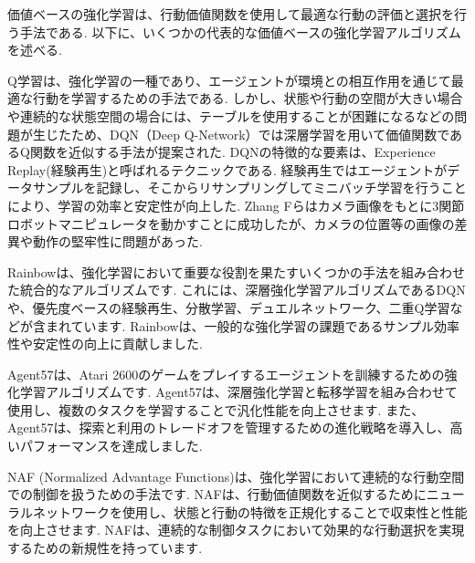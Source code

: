 \documentclass[a4j, twocolumn, 10pt,pdflatex,ja=standard]{bxjsarticle}
\renewcommand{\tablename}{表}
\def \tabref  #1{\tablename\ref{#1}}
\begin{document}

価値ベースの強化学習は、行動価値関数を使用して最適な行動の評価と選択を行う手法である. 以下に、いくつかの代表的な価値ベースの強化学習アルゴリズムを述べる. 

Q学習は、強化学習の一種であり、エージェントが環境との相互作用を通じて最適な行動を学習するための手法である. しかし、状態や行動の空間が大きい場合や連続的な状態空間の場合には、テーブルを使用することが困難になるなどの問題が生じたため、DQN（Deep Q-Network）\cite{dqn}では深層学習を用いて価値関数であるQ関数を近似する手法が提案された. DQNの特徴的な要素は、Experience Replay(経験再生)と呼ばれるテクニックである. 経験再生ではエージェントがデータサンプルを記録し、そこからリサンプリングしてミニバッチ学習を行うことにより、学習の効率と安定性が向上した. Zhang Fらはカメラ画像をもとに3関節ロボットマニピュレータを動かすことに成功したが、カメラの位置等の画像の差異や動作の堅牢性に問題があった\cite{dqnrobot}. 

Rainbow\cite{rainbow}は、強化学習において重要な役割を果たすいくつかの手法を組み合わせた統合的なアルゴリズムです. これには、深層強化学習アルゴリズムであるDQNや、優先度ベースの経験再生、分散学習、デュエルネットワーク、二重Q学習などが含まれています. Rainbowは、一般的な強化学習の課題であるサンプル効率性や安定性の向上に貢献しました. 

Agent57\cite{agent57}は、Atari 2600のゲームをプレイするエージェントを訓練するための強化学習アルゴリズムです. Agent57は、深層強化学習と転移学習を組み合わせて使用し、複数のタスクを学習することで汎化性能を向上させます. また、Agent57は、探索と利用のトレードオフを管理するための進化戦略を導入し、高いパフォーマンスを達成しました. 

NAF (Normalized Advantage Functions)\cite{naf}は、強化学習において連続的な行動空間での制御を扱うための手法です. NAFは、行動価値関数を近似するためにニューラルネットワークを使用し、状態と行動の特徴を正規化することで収束性と性能を向上させます. NAFは、連続的な制御タスクにおいて効果的な行動選択を実現するための新規性を持っています. 
\end{document}
